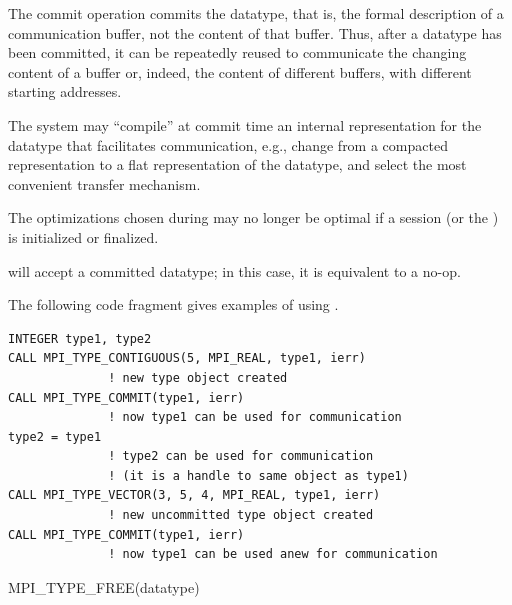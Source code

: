 The commit operation commits the datatype, that is, the formal description of
a communication buffer, not the content of that buffer.  Thus, after a datatype
has been committed, it can be repeatedly reused to communicate the changing
content
of a buffer or, indeed, the content of different buffers, with different
starting addresses.

\begin{implementors}
The system may ``compile'' at commit time an internal
representation for the datatype that facilitates
communication, e.g.,
change from a compacted representation to a flat representation of the
datatype, and select the most convenient transfer mechanism.

The optimizations chosen during  may no longer be optimal
if a session (or the \wpm{}) is initialized or finalized.
\end{implementors}

will accept a committed datatype;
in this case, it is equivalent to a no-op.


\begin{example}
\label{datatype-exY}
%
The following code fragment gives examples of using
.
\begin{lstlisting}[language={[MPI]Fortran}]
INTEGER type1, type2
CALL MPI_TYPE_CONTIGUOUS(5, MPI_REAL, type1, ierr)
              ! new type object created
CALL MPI_TYPE_COMMIT(type1, ierr)
              ! now type1 can be used for communication
type2 = type1
              ! type2 can be used for communication
              ! (it is a handle to same object as type1)
CALL MPI_TYPE_VECTOR(3, 5, 4, MPI_REAL, type1, ierr)
              ! new uncommitted type object created
CALL MPI_TYPE_COMMIT(type1, ierr)
              ! now type1 can be used anew for communication
\end{lstlisting}
\end{example}

\begin{funcdef}{MPI\_TYPE\_FREE}{(\mbox{datatype})}
\end{funcdef}

